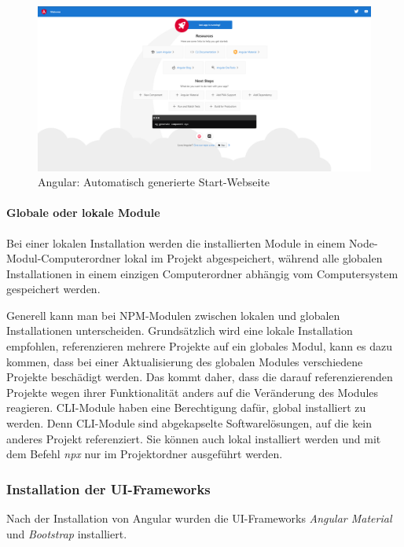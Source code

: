 \begin{figure}
    \centering
    \includegraphics[scale=0.25]{pics/AngularStartingPage.png}
    \caption{Angular: Automatisch generierte Start-Webseite}
    \label{fig:impl:angular-starting-page}
\end{figure}

\paragraph{Globale oder lokale Module}
Bei einer lokalen Installation werden die installierten Module in einem Node-Modul-Computerordner lokal im Projekt abgespeichert, während alle globalen Installationen in einem einzigen Computerordner abhängig vom Computersystem gespeichert werden.

Generell kann man bei NPM-Modulen zwischen lokalen und globalen Installationen unterscheiden. Grundsätzlich wird eine lokale Installation empfohlen, referenzieren mehrere Projekte auf ein globales Modul, kann es dazu kommen, dass bei einer Aktualisierung des globalen Modules verschiedene Projekte beschädigt werden.
Das kommt daher, dass die darauf referenzierenden Projekte wegen ihrer Funktionalität anders auf die Veränderung des Modules reagieren.
CLI-Module haben eine Berechtigung dafür, global installiert zu werden. Denn CLI-Module sind abgekapselte Softwarelösungen, auf die kein anderes Projekt referenziert. Sie können auch lokal installiert werden und mit dem Befehl \emph{npx} nur im Projektordner ausgeführt werden.\cite{npmlocalorglobal}

\subsubsection{Installation der UI-Frameworks}

Nach der Installation von Angular wurden die UI-Frameworks \emph{Angular Material} und \emph{Bootstrap} installiert. 

